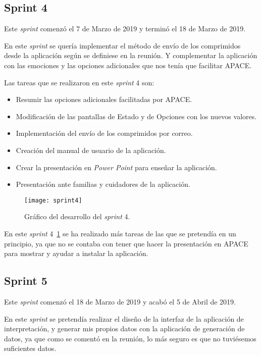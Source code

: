 \subsection{Sprint 4}
Este \textit{sprint} comenzó el 7 de Marzo de 2019 y terminó el 18 de Marzo de 2019.

En este \textit{sprint} se quería implementar el método de envío de los comprimidos desde la aplicación según se definiese en la reunión. Y complementar la aplicación con las emociones y las opciones adicionales que nos tenía que facilitar APACE.

Las tareas que se realizaron en este \textit{sprint} 4 son:
\begin{itemize}
	\item Resumir las opciones adicionales facilitadas por APACE.
	\item Modificación de las pantallas de Estado y de Opciones con los nuevos valores.
	\item Implementación del envío de los comprimidos por correo.
	\item Creación del manual de usuario de la aplicación.
	\item Crear la presentación en \textit{Power Point} para enseñar la aplicación.
	\item Presentación ante familias y cuidadores de la aplicación.
\end{itemize}

\begin{figure}
	\centering
	\texttt{[image: sprint4]}
	\caption{Gráfico del desarrollo del \textit{sprint} 4.}
	\label{fig:sprint4}
\end{figure}

En este \textit{sprint} 4~\ref{fig:sprint4} se ha realizado más tareas de las que se pretendía en un principio, ya que no se contaba con tener que hacer la presentación en APACE para mostrar y ayudar a instalar la aplicación.

\subsection{Sprint 5}
Este \textit{sprint} comenzó el 18 de Marzo de 2019 y acabó el 5 de Abril de 2019.

En este \textit{sprint} se pretendía realizar el diseño de la interfaz de la aplicación de interpretación, y generar mis propios datos con la aplicación de generación de datos, ya que como se comentó en la reunión, lo más seguro es que no tuviésemos suficientes datos.


